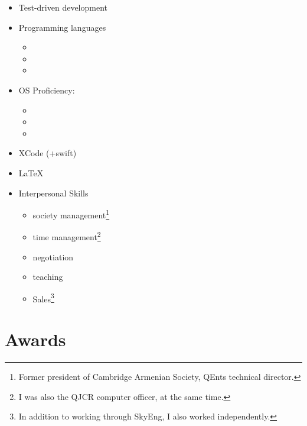\documentclass{CurriculumVitae}[10pt, draft, condensed]
\begin{document}
\begin{multicols}{4}
\begin{itemize}[topsep=0pt]
\begin{itemize}[topsep=0pt, partopsep=0pt]
    \item {}
    \item {}
    \end{itemize}
  \item {\footnotesize Test-driven development}
  \item {\footnotesize Programming languages}
    \begin{itemize}[topsep=0pt, partopsep=0pt]
      \setlength{\itemsep}{-0.3em}
    \item {}
    \item {}
    \item {}
    \end{itemize}
  \item {\footnotesize OS Proficiency:}
    \begin{itemize}[topsep=0pt, partopsep=0pt]
      \setlength{\itemsep}{-0.3em}
    \item {}
    \item {}
    \item {}
    \end{itemize}
  \item {\footnotesize XCode (+swift)}
  \item {\footnotesize \LaTeX{}}
  \item {\footnotesize Interpersonal Skills}
    \begin{itemize}[topsep=0pt, partopsep=0pt]
      \setlength{\itemsep}{-0.3em}
    \item society management\footnote{Former president of Cambridge
        Armenian Society, QEnts technical director.}
    \item time management\footnote{I was also the QJCR computer
        officer, at the same time. }
    \item negotiation
    \item teaching
    \item Sales\footnote{In addition to working through SkyEng, I also
        worked independently. }
    \end{itemize}
  \end{itemize}
  
\end{multicols}

\section*{Awards}







\end{document}
